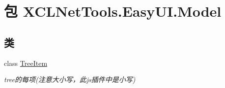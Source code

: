 \hypertarget{namespace_x_c_l_net_tools_1_1_easy_u_i_1_1_model}{\section{包 X\-C\-L\-Net\-Tools.\-Easy\-U\-I.\-Model}
\label{namespace_x_c_l_net_tools_1_1_easy_u_i_1_1_model}
}
\subsection*{类}
\begin{DoxyCompactItemize}
\item 
class \hyperlink{class_x_c_l_net_tools_1_1_easy_u_i_1_1_model_1_1_tree_item}{Tree\-Item}
\begin{DoxyCompactList}\small\item\em tree的每项(注意大小写，此js插件中是小写) \end{DoxyCompactList}\end{DoxyCompactItemize}

